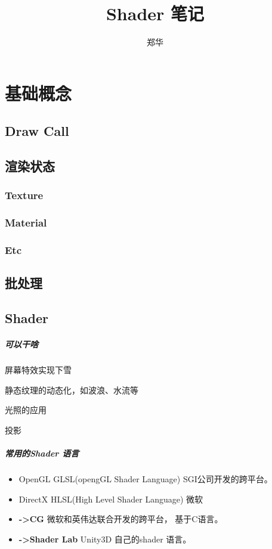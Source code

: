 \documentclass[UTF8,a4paper,12pt]{ctexbook}
\author{\kaishu 郑华}
\title{\heiti Shader 笔记}
\begin{document}
 	\maketitle
	\tableofcontents 
	
\chapter{基础概念}
	\section{Draw Call}	

	\section{渲染状态}
		\subsection{Texture}
		
		\subsection{Material}
		
		\subsection{Etc}

	\section{批处理}
	
	
	\section{Shader}
		\paragraph{可以干啥}
		
		屏幕特效实现下雪
		
		静态纹理的动态化，如波浪、水流等
		
		光照的应用
		
		投影
	
		\paragraph{常用的Shader 语言}
				\begin{itemize}
					\item OpenGL GLSL(opengGL Shader Language) SGI公司开发的跨平台。
					\item DirectX  HLSL(High Level Shader Language) 微软
					\item \textbf{->CG} 微软和英伟达联合开发的跨平台， 基于C语言。
					\item \textbf{->Shader Lab} Unity3D 自己的shader 语言。
				\end{itemize}
		
\end{document}
